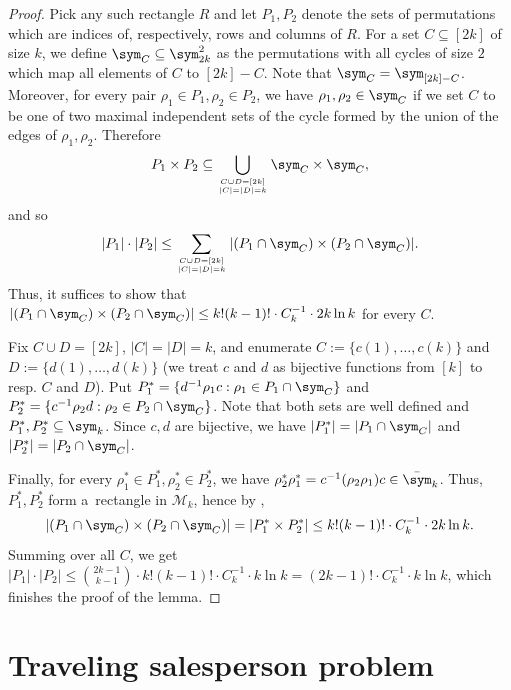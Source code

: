 \begin{proof}
    Pick any such rectangle $R$ and let $P_1, P_2$ denote the sets of permutations which are indices of, respectively, rows and columns of $R$. For a set $C \subseteq [2k]$ of size $k$, we define $\sym_C \subseteq \sym_{2k}^2$ as the permutations with all cycles of size $2$ which map all elements of $C$ to $[2k] - C$. Note that $\sym_C = \sym_{[2k] - C}$. Moreover, for every pair $\rho_1 \in P_1, \rho_2 \in P_2$, we have $\rho_1, \rho_2 \in \sym_C$ if we set $C$ to be one of two maximal independent sets of the cycle formed by the union of the edges of $\rho_1, \rho_2$. Therefore
    $$
        P_1 \times P_2 \subseteq \bigcup_{C \cup D = [2k] \atop |C| = |D| = k} \sym_C \times \sym_C,
    $$
    and so
    $$
        |P_1| \cdot |P_2| \leq
        \sum_{C \cup D = [2k] \atop |C| = |D| = k}
            |(P_1 \cap \sym_C) \times (P_2 \cap \sym_C)|.
    $$
    Thus, it suffices to show that $|(P_1 \cap \sym_C) \times (P_2 \cap \sym_C)| \leq k!(k - 1)! \cdot C_k^{-1} \cdot 2k \ln k$ for every $C$.

    Fix $C \cup D = [2k]$, $|C| = |D| = k$, and enumerate $C := \{ c(1), \dots, c(k) \}$ and $D := \{ d(1), \dots, d(k) \}$ (we treat $c$ and $d$ as bijective functions from $[k]$ to resp. $C$ and $D$).
    Put $P_1^* = \{d^{-1} \rho_1 c : \rho_1 \in P_1 \cap \sym_C\}$
    and $P_2^* = \{c^{-1} \rho_2 d : \rho_2 \in P_2 \cap \sym_C \}$. Note that both sets are well defined and $P_1^*, P_2^* \subseteq \sym_k$.
    Since $c, d$ are bijective, we have $|P_1^*| = |P_1 \cap \sym_C|$ and $|P_2^*| = |P_2 \cap \sym_C|$.
    
    Finally, for every $\rho_1^* \in P^*_1, \rho_2^* \in P^*_2$, we have $\rho_2^* \rho_1^* = c^{-1} (\rho_2 \rho_1) c \in \bar\sym_k$. Thus, $P_1^*, P_2^*$ form a~rectangle in $\mathcal{M}_k$, hence by ,
    $$
        |(P_1 \cap \sym_C) \times (P_2 \cap \sym_C)| =
        |P_1^* \times P_2^*| \leq k!(k - 1)! \cdot C_k^{-1} \cdot 2k \ln k.
    $$
    Summing over all $C$, we get $|P_1| \cdot |P_2| \leq \binom{2k - 1}{k - 1} \cdot k!(k - 1)! \cdot C_k^{-1} \cdot k \ln k = (2k - 1)! \cdot C_k^{-1} \cdot k \ln k$, which finishes the proof of the lemma.
\end{proof}


\section{Traveling salesperson problem}
\label{sec:tsp}


